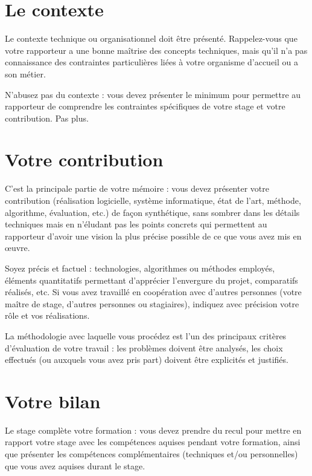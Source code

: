 \documentclass [twoside,openright,a4paper,11pt,french] {report}
\begin{document}
\section {Le contexte}

Le contexte technique ou organisationnel doit être présenté.
Rappelez-vous que votre rapporteur a une bonne maîtrise des concepts
techniques, mais qu'il n'a pas connaissance des contraintes particulières
liées à votre organisme d'accueil ou a son métier.

N'abusez pas du contexte : vous devez présenter le minimum pour permettre
au rapporteur de comprendre les contraintes spécifiques de votre stage
et votre contribution. Pas plus.


\section {Votre contribution}

C'est la principale partie de votre mémoire : vous devez présenter votre
contribution (réalisation logicielle, système informatique, état de
l'art, méthode, algorithme, évaluation, etc.) de façon synthétique,
sans sombrer dans les détails techniques mais en n'éludant pas les
points concrets qui permettent au rapporteur d'avoir une vision la plus
précise possible de ce que vous avez mis en {\oe}uvre.

Soyez précis et factuel : technologies, algorithmes ou méthodes
employés, éléments quantitatifs permettant d'apprécier l'envergure
du projet, comparatifs réalisés, etc. Si vous avez travaillé en
coopération avec d'autres personnes (votre maître de stage, d'autres
personnes ou stagiaires), indiquez avec précision votre rôle et vos
réalisations.

La méthodologie avec laquelle vous procédez est l'un des principaux
critères d'évaluation de votre travail : les problèmes doivent
être analysés, les choix effectués (ou auxquels vous avez pris part)
doivent être explicités et justifiés.

\section {Votre bilan}

Le stage complète votre formation : vous devez prendre du recul pour
mettre en rapport votre stage avec les compétences aquises pendant
votre formation, ainsi que présenter les compétences complémentaires
(techniques et/ou personnelles) que vous avez aquises durant le stage.
\end{document}
